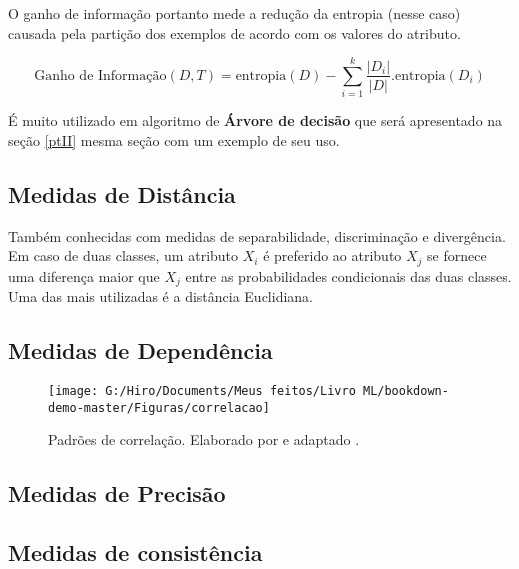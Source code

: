 \documentclass[
]{book}
\begin{document}
O ganho de informação portanto mede a redução da entropia (nesse caso) causada pela partição dos exemplos de acordo com os valores do atributo.

\begin{equation} 
  \mbox{Ganho de Informação}(D,T)=\mbox{entropia}(D)-\displaystyle \sum_{i=1}^k \frac{|D_i|}{|D|}. \mbox{entropia}(D_i) 
  \label{eq:ganhodeinf}
\end{equation}

É muito utilizado em algoritmo de \textbf{Árvore de decisão} que será apresentado na seção \ref{ptII} mesma seção com um exemplo de seu uso.

\hypertarget{meddist}{%
\subsection{Medidas de Distância}\label{meddist}}

Também conhecidas com medidas de separabilidade, discriminação e divergência. Em caso de duas classes, um atributo \(X_i\) é preferido ao atributo \(X_j\) se fornece uma diferença maior que \(X_j\) entre as probabilidades condicionais das duas classes. Uma das mais utilizadas é a distância Euclidiana.

\hypertarget{medidasdep}{%
\subsection{Medidas de Dependência}\label{medidasdep}}

\begin{figure}

{\centering \texttt{[image: G:/Hiro/Documents/Meus feitos/Livro ML/bookdown-demo-master/Figuras/correlacao]} 

}

\caption{Padrões de correlação. Elaborado por \citet{gujarati2011econometria} e adaptado \citet{theil1978}.}\label{fig:correlacao}
\end{figure}



\hypertarget{medidas-de-precisuxe3o}{%
\subsection{Medidas de Precisão}\label{medidas-de-precisuxe3o}}

\hypertarget{medidas-de-consistuxeancia}{%
\subsection{Medidas de consistência}\label{medidas-de-consistuxeancia}}
\end{document}
